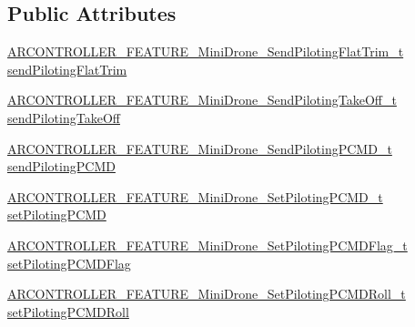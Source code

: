 \subsection*{Public Attributes}
\begin{DoxyCompactItemize}
\item 
\hyperlink{_a_r_c_o_n_t_r_o_l_l_e_r___feature_8h_aa29eae2c60270f54dc5043ee1a3af9dc}{A\+R\+C\+O\+N\+T\+R\+O\+L\+L\+E\+R\+\_\+\+F\+E\+A\+T\+U\+R\+E\+\_\+\+Mini\+Drone\+\_\+\+Send\+Piloting\+Flat\+Trim\+\_\+t} \hyperlink{struct_a_r_c_o_n_t_r_o_l_l_e_r___f_e_a_t_u_r_e___mini_drone__t_acdcc4e956290b184427161ff772ff65e}{send\+Piloting\+Flat\+Trim}
\item 
\hyperlink{_a_r_c_o_n_t_r_o_l_l_e_r___feature_8h_abad55d2990a6184574e5c8cbbf632836}{A\+R\+C\+O\+N\+T\+R\+O\+L\+L\+E\+R\+\_\+\+F\+E\+A\+T\+U\+R\+E\+\_\+\+Mini\+Drone\+\_\+\+Send\+Piloting\+Take\+Off\+\_\+t} \hyperlink{struct_a_r_c_o_n_t_r_o_l_l_e_r___f_e_a_t_u_r_e___mini_drone__t_abf008ec5da17dd2023f58ee2a8bbb240}{send\+Piloting\+Take\+Off}
\item 
\hyperlink{_a_r_c_o_n_t_r_o_l_l_e_r___feature_8h_a9e61a361663265fa296bc2f11bdf4486}{A\+R\+C\+O\+N\+T\+R\+O\+L\+L\+E\+R\+\_\+\+F\+E\+A\+T\+U\+R\+E\+\_\+\+Mini\+Drone\+\_\+\+Send\+Piloting\+P\+C\+M\+D\+\_\+t} \hyperlink{struct_a_r_c_o_n_t_r_o_l_l_e_r___f_e_a_t_u_r_e___mini_drone__t_abaee01b9a29029832ea63905713e34d4}{send\+Piloting\+P\+C\+MD}
\item 
\hyperlink{_a_r_c_o_n_t_r_o_l_l_e_r___feature_8h_ad2369786c60e5b4f81bdcbca392c7b05}{A\+R\+C\+O\+N\+T\+R\+O\+L\+L\+E\+R\+\_\+\+F\+E\+A\+T\+U\+R\+E\+\_\+\+Mini\+Drone\+\_\+\+Set\+Piloting\+P\+C\+M\+D\+\_\+t} \hyperlink{struct_a_r_c_o_n_t_r_o_l_l_e_r___f_e_a_t_u_r_e___mini_drone__t_ab6a648a957f60df0e997f4f0d0079304}{set\+Piloting\+P\+C\+MD}
\item 
\hyperlink{_a_r_c_o_n_t_r_o_l_l_e_r___feature_8h_a68ec64686642801f7c1560d389663294}{A\+R\+C\+O\+N\+T\+R\+O\+L\+L\+E\+R\+\_\+\+F\+E\+A\+T\+U\+R\+E\+\_\+\+Mini\+Drone\+\_\+\+Set\+Piloting\+P\+C\+M\+D\+Flag\+\_\+t} \hyperlink{struct_a_r_c_o_n_t_r_o_l_l_e_r___f_e_a_t_u_r_e___mini_drone__t_a5962292ecf3b442fea5d03ecc017bfe3}{set\+Piloting\+P\+C\+M\+D\+Flag}
\item 
\hyperlink{_a_r_c_o_n_t_r_o_l_l_e_r___feature_8h_a1714f8271952a283468fead51e5e2ba1}{A\+R\+C\+O\+N\+T\+R\+O\+L\+L\+E\+R\+\_\+\+F\+E\+A\+T\+U\+R\+E\+\_\+\+Mini\+Drone\+\_\+\+Set\+Piloting\+P\+C\+M\+D\+Roll\+\_\+t} \hyperlink{struct_a_r_c_o_n_t_r_o_l_l_e_r___f_e_a_t_u_r_e___mini_drone__t_a9d4a64d4868844c50364224e7481c019}{set\+Piloting\+P\+C\+M\+D\+Roll}

\end{DoxyCompactItemize}
